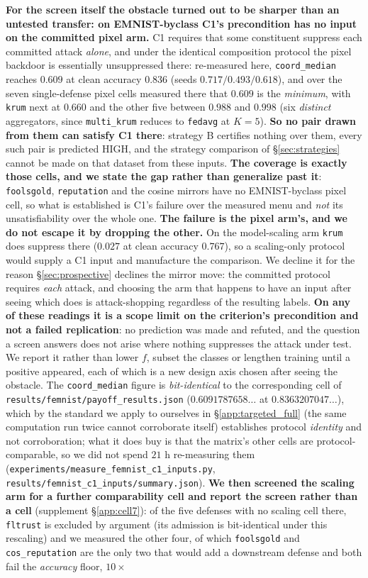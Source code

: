 \documentclass{article}
\begin{document}
\noindent \textbf{For the screen itself the obstacle turned out to be sharper than an untested transfer: on EMNIST-byclass C1's precondition has no input on the committed pixel arm.} C1 requires that some constituent suppress each committed attack \emph{alone}, and under the identical composition protocol the pixel backdoor is essentially unsuppressed there: re-measured here, \texttt{coord\_median} reaches $0.609$ at clean accuracy $0.836$ (seeds $0.717/0.493/0.618$), and over the seven single-defense pixel cells measured there that $0.609$ is the \emph{minimum}, with \texttt{krum} next at $0.660$ and the other five between $0.988$ and $0.998$ (six \emph{distinct} aggregators, since \texttt{multi\_krum} reduces to \texttt{fedavg} at $K{=}5$). \textbf{So no pair drawn from them can satisfy C1 there}: strategy B certifies nothing over them, every such pair is predicted HIGH, and the strategy comparison of §\ref{sec:strategies} cannot be made on that dataset from these inputs. \textbf{The coverage is exactly those cells, and we state the gap rather than generalize past it}: \texttt{foolsgold}, \texttt{reputation} and the cosine mirrors have no EMNIST-byclass pixel cell, so what is established is C1's failure over the measured menu and \emph{not} its unsatisfiability over the whole one. \textbf{The failure is the pixel arm's, and we do not escape it by dropping the other.} On the model-scaling arm \texttt{krum} does suppress there ($0.027$ at clean accuracy $0.767$), so a scaling-only protocol would supply a C1 input and manufacture the comparison. We decline it for the reason §\ref{sec:prospective} declines the mirror move: the committed protocol requires \emph{each} attack, and choosing the arm that happens to have an input after seeing which does is attack-shopping regardless of the resulting labels. \textbf{On any of these readings it is a scope limit on the criterion's precondition and not a failed replication}: no prediction was made and refuted, and the question a screen answers does not arise where nothing suppresses the attack under test. We report it rather than lower $f$, subset the classes or lengthen training until a positive appeared, each of which is a new design axis chosen after seeing the obstacle. The \texttt{coord\_median} figure is \emph{bit-identical} to the corresponding cell of \texttt{results/femnist/payoff\_results.json} ($0.6091787658\ldots$ at $0.8363207047\ldots$), which by the standard we apply to ourselves in §\ref{app:targeted_full} (the same computation run twice cannot corroborate itself) establishes protocol \emph{identity} and not corroboration; what it does buy is that the matrix's other cells are protocol-comparable, so we did not spend $21$ h re-measuring them (\texttt{experiments/measure\_femnist\_c1\_inputs.py}, \texttt{results/femnist\_c1\_inputs/summary.json}). \textbf{We then screened the scaling arm for a further comparability cell and report the screen rather than a cell} (supplement §\ref{app:cell7}): of the five defenses with no scaling cell there, \texttt{fltrust} is excluded by argument (its admission is bit-identical under this rescaling) and we measured the other four, of which \texttt{foolsgold} and \texttt{cos\_reputation} are the only two that would add a downstream defense and both fail the \emph{accuracy} floor, $10\times$ 
\end{document}
